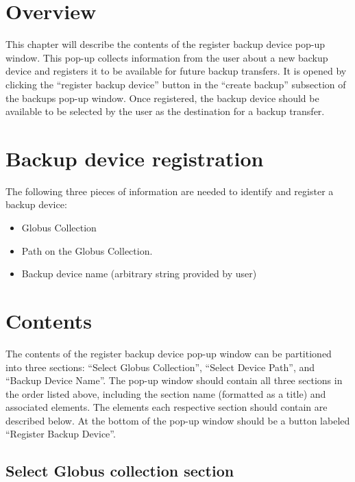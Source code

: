 
\section{Overview}

This chapter will describe the contents of the register backup device pop-up 
window. This pop-up collects information from the user about a new backup device 
and registers it to be available for future backup transfers. It is opened by
clicking the ``register backup device'' button in the ``create backup'' subsection 
of the backups pop-up window. Once registered, the backup device should be available 
to be selected by the user as the destination for a backup transfer.

\section{Backup device registration}

The following three pieces of information are needed to identify and register a backup 
device:

\begin{itemize}\itemsep1pt
    \item Globus Collection
    \item Path on the Globus Collection.
    \item Backup device name (arbitrary string provided by user)
\end{itemize}

\section{Contents}

The contents of the  register backup device pop-up window can be partitioned into three 
sections: ``Select Globus Collection'', ``Select Device Path'', and ``Backup Device Name''. 
The pop-up window should contain all three sections in the order listed above, including 
the section name (formatted as a title) and associated elements. The elements each 
respective section should contain are described below. At the bottom of the pop-up window
should be a button labeled ``Register Backup Device''.

\subsection{Select Globus collection section}

